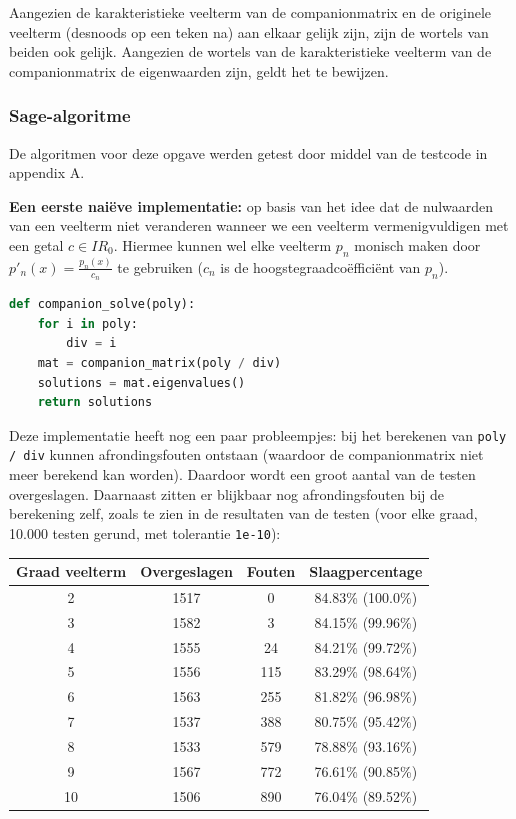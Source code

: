 \documentclass{article}
\begin{document}
Aangezien de karakteristieke veelterm van de companionmatrix en de originele veelterm (desnoods op een teken na) aan elkaar gelijk zijn, zijn de wortels van beiden ook gelijk. Aangezien de wortels van de karakteristieke veelterm van de companionmatrix de eigenwaarden zijn, geldt het te bewijzen.

\subsubsection{Sage-algoritme}
De algoritmen voor deze opgave werden getest door middel van de testcode in appendix A.


\textbf{Een eerste nai\"eve implementatie:} op basis van het idee dat de nulwaarden van een veelterm niet veranderen wanneer we een veelterm vermenigvuldigen met een getal \(c \in I\!R_0\). Hiermee kunnen wel elke veelterm \(p_n\) monisch maken door \(p'_n(x) = \frac{p_n(x)}{c_n}\) te gebruiken (\(c_n\) is de hoogstegraadco\"effici\"ent van \(p_n\)).
\begin{lstlisting}[language=Python]
def companion_solve(poly):
    for i in poly:
        div = i
    mat = companion_matrix(poly / div)
    solutions = mat.eigenvalues()
    return solutions
\end{lstlisting}
Deze implementatie heeft nog een paar probleempjes: bij het berekenen van \verb|poly / div| kunnen afrondingsfouten ontstaan (waardoor de companionmatrix niet meer berekend kan worden). Daardoor wordt een groot aantal van de testen overgeslagen. Daarnaast zitten er blijkbaar nog afrondingsfouten bij de berekening zelf, zoals te zien in de resultaten van de testen (voor elke graad, 10.000 testen gerund, met tolerantie \verb|1e-10|):\\
\begin{tabular}{|c|c|c|c|}
 \hline
 \textbf{Graad veelterm} & \textbf{Overgeslagen} & \textbf{Fouten} & \textbf{Slaagpercentage} \\
 \hline
 2  & 1517 & 0   & 84.83\% (100.0\%) \\
 3  & 1582 & 3   & 84.15\% (99.96\%) \\
 4  & 1555 & 24  & 84.21\% (99.72\%) \\
 5  & 1556 & 115 & 83.29\% (98.64\%) \\
 6  & 1563 & 255 & 81.82\% (96.98\%) \\
 7  & 1537 & 388 & 80.75\% (95.42\%) \\
 8  & 1533 & 579 & 78.88\% (93.16\%) \\
 9  & 1567 & 772 & 76.61\% (90.85\%) \\
 10 & 1506 & 890 & 76.04\% (89.52\%) \\
 \hline
\end{tabular} \\
\end{document}
